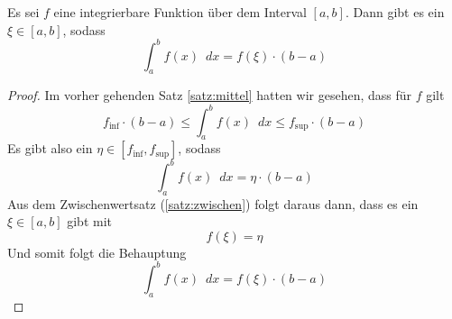 \begin{satz}
Es sei $f$ eine integrierbare Funktion über dem Interval $[a,b]$. Dann gibt es ein $\xi \in [a,b]$, sodass 
\begin{equation}
\int_a^b f(x) \enspace dx = f(\xi) \cdot (b-a)
\end{equation}
\end{satz}
\begin{proof}
Im vorher gehenden Satz \ref{satz:mittel} hatten wir gesehen, dass für $f$ gilt
\begin{equation}
f_{\inf}\cdot (b-a) \le \int_{a}^{b} f(x) \enspace dx \le f_{\sup} \cdot (b-a)
\end{equation}
Es gibt also ein $\eta \in [f_{\inf},f_{\sup}]$, sodass 
\begin{equation}
\int_{a}^{b} f(x) \enspace dx = \eta \cdot (b-a)
\end{equation}
Aus dem Zwischenwertsatz (\ref{satz:zwischen}) folgt daraus dann, dass es ein $\xi \in [a,b]$ gibt mit 
\begin{equation}
f(\xi) = \eta
\end{equation}
Und somit folgt die Behauptung
\begin{equation}
\int_a^b f(x) \enspace dx = f(\xi) \cdot (b-a)
\end{equation}
\end{proof}

